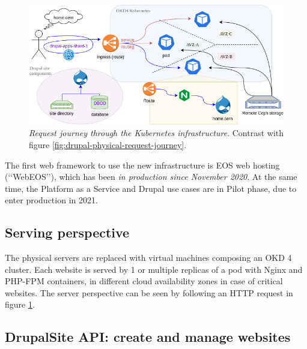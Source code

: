 \begin{figure}
    \centering
    \hspace{-1.8em}
    \includegraphics[width=.66\textwidth]{figures/drupal-k8s-request-journey}
    \caption{\emph{Request journey through the Kubernetes infrastructure}. Contrast with figure \ref{fig:drupal-physical-request-journey}.}
    \vspace{-4em}
    \label{fig:drupal-k8s-request-journey}
\end{figure}

The first web framework to use the new infrastructure is EOS web hosting (\lq\lq WebEOS\rq\rq), which has been \emph{in production since November 2020}.
At the same time, the Platform as a Service and Drupal use cases are in Pilot phase, due to enter production in 2021.

\subsection{Serving perspective}

The physical servers are replaced with virtual machines composing an OKD 4 cluster.
Each website is served by 1 or multiple replicas of a pod with Nginx and PHP-FPM containers,
in different cloud availability zones in case of critical websites.
The server perspective can be seen by following an HTTP request in figure \ref{fig:drupal-k8s-request-journey}.

\subsection{DrupalSite API: create and manage websites}

